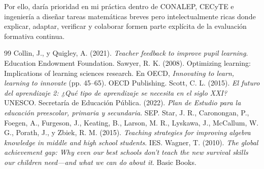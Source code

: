 \documentclass[spanish,letterpaper,oneside]{article}
\begin{document}
Por ello, daría prioridad en mi práctica dentro de CONALEP, CECyTE e ingeniería a diseñar tareas matemáticas breves pero intelectualmente ricas donde explicar, adaptar, verificar y colaborar formen parte explícita de la evaluación formativa continua.

\clearpage
\begin{thebibliography}{99}
 Collin, J., y Quigley, A. (2021). \textit{Teacher feedback to improve pupil learning}. Education Endowment Foundation.
 Sawyer, R. K. (2008). Optimizing learning: Implications of learning sciences research. En OECD, \textit{Innovating to learn, learning to innovate} (pp. 45--65). OECD Publishing.
 Scott, C. L. (2015). \textit{El futuro del aprendizaje 2: ¿Qué tipo de aprendizaje se necesita en el siglo XXI?} UNESCO.
 Secretaría de Educación Pública. (2022). \textit{Plan de Estudio para la educación preescolar, primaria y secundaria}. SEP.
 Star, J. R., Caronongan, P., Foegen, A., Furgeson, J., Keating, B., Larson, M. R., Lyskawa, J., McCallum, W. G., Porath, J., y Zbiek, R. M. (2015). \textit{Teaching strategies for improving algebra knowledge in middle and high school students}. IES.
 Wagner, T. (2010). \textit{The global achievement gap: Why even our best schools don't teach the new survival skills our children need---and what we can do about it}. Basic Books.
\end{thebibliography}
\end{document}
